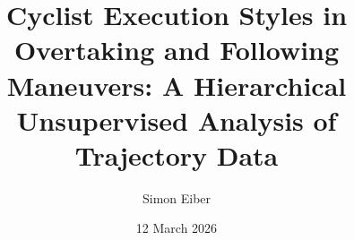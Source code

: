 \usepackage[utf8]{inputenc}
\usepackage[T1]{fontenc}
\usepackage{graphicx}
\usepackage{subcaption}
%

\usepackage{amsmath}
\usepackage{paralist}
\usepackage{tikz}
\usetikzlibrary{positioning}

\usepackage{hyperref}
\usepackage[a4paper,width=150mm,top=25mm,bottom=25mm,bindingoffset=6mm]{geometry}
\setcounter{secnumdepth}{3}
\setcounter{tocdepth}{2}



\usepackage{booktabs}
\usepackage{multirow}
\usepackage{longtable}
\usepackage{color}
\usepackage{tabularray}

\usepackage{fancyhdr}
\pagestyle{fancy}
\fancyhf{}
\fancyhead[L]{\rightmark}
\fancyfoot[C]{\thepage}

\usepackage[
	style=ieee,
	maxcitenames=2,
	mincitenames=1,
	maxbibnames=6,
	minbibnames=1,
	url=false,
	doi=false,
	date=year,
	sorting=none
]{biblatex}





\title{Cyclist Execution Styles in Overtaking and Following Maneuvers: A Hierarchical Unsupervised Analysis of Trajectory Data}
\author{Simon Eiber}
\date{12 March 2026}

